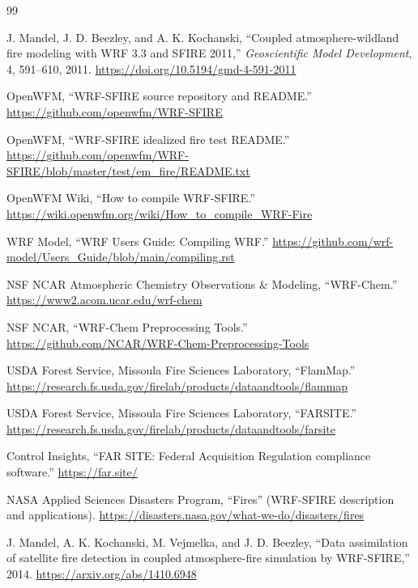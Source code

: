 \documentclass[11pt]{article}
\begin{document}
\begin{thebibliography}{99}

J. Mandel, J. D. Beezley, and A. K. Kochanski,
``Coupled atmosphere-wildland fire modeling with WRF 3.3 and SFIRE 2011,''
\emph{Geoscientific Model Development}, 4, 591--610, 2011.
\url{https://doi.org/10.5194/gmd-4-591-2011}

OpenWFM, ``WRF-SFIRE source repository and README.''
\url{https://github.com/openwfm/WRF-SFIRE}

OpenWFM, ``WRF-SFIRE idealized fire test README.''
\url{https://github.com/openwfm/WRF-SFIRE/blob/master/test/em_fire/README.txt}

OpenWFM Wiki, ``How to compile WRF-SFIRE.''
\url{https://wiki.openwfm.org/wiki/How_to_compile_WRF-Fire}

WRF Model, ``WRF Users Guide: Compiling WRF.''
\url{https://github.com/wrf-model/Users_Guide/blob/main/compiling.rst}

NSF NCAR Atmospheric Chemistry Observations \& Modeling,
``WRF-Chem.''
\url{https://www2.acom.ucar.edu/wrf-chem}

NSF NCAR, ``WRF-Chem Preprocessing Tools.''
\url{https://github.com/NCAR/WRF-Chem-Preprocessing-Tools}

USDA Forest Service, Missoula Fire Sciences Laboratory, ``FlamMap.''
\url{https://research.fs.usda.gov/firelab/products/dataandtools/flammap}

USDA Forest Service, Missoula Fire Sciences Laboratory, ``FARSITE.''
\url{https://research.fs.usda.gov/firelab/products/dataandtools/farsite}

Control Insights, ``FAR SITE: Federal Acquisition Regulation compliance software.''
\url{https://far.site/}

NASA Applied Sciences Disasters Program, ``Fires'' (WRF-SFIRE description and applications).
\url{https://disasters.nasa.gov/what-we-do/disasters/fires}

J. Mandel, A. K. Kochanski, M. Vejmelka, and J. D. Beezley,
``Data assimilation of satellite fire detection in coupled atmosphere-fire simulation by WRF-SFIRE,'' 2014.
\url{https://arxiv.org/abs/1410.6948}

\end{thebibliography}
\end{document}

